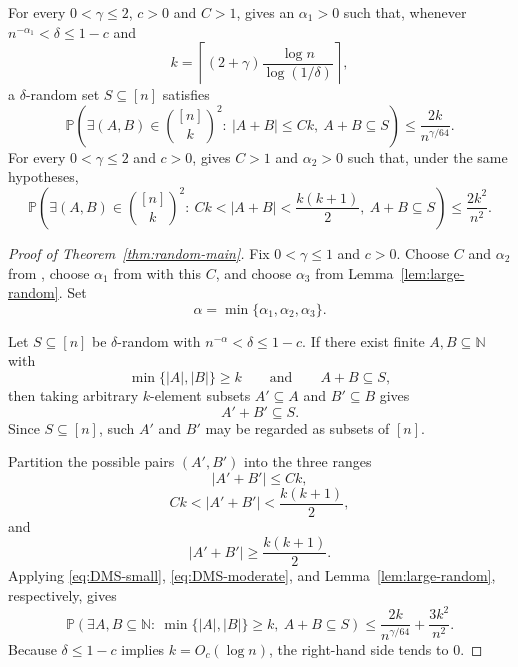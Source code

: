 \documentclass[11pt]{article}
\newcommand{\N}{\mathbb{N}}
\newcommand{\Prob}{\mathbb{P}}
\begin{document}
For every $0<\gamma\le2$, $c>0$ and $C>1$, \cite[Lemma 2.1]{DMS} gives an $\alpha_1>0$ such that, whenever $n^{-\alpha_1}<\delta\le1-c$ and
\[
 k=\left\lceil(2+\gamma)\frac{\log n}{\log(1/\delta)}\right\rceil,
\]
a $\delta$-random set $S\subseteq[n]$ satisfies
\begin{equation}\label{eq:DMS-small}
 \Prob\left(
 \exists(A,B)\in\binom{[n]}{k}^2:\
 |A+B|\le Ck,\ A+B\subseteq S
 \right)
 \le \frac{2k}{n^{\gamma/64}}.
\end{equation}
For every $0<\gamma\le2$ and $c>0$, \cite[Corollary 3.3]{DMS} gives $C>1$ and $\alpha_2>0$ such that, under the same hypotheses,
\begin{equation}\label{eq:DMS-moderate}
 \Prob\left(
 \exists(A,B)\in\binom{[n]}{k}^2:\
 Ck<|A+B|<\frac{k(k+1)}2,\ A+B\subseteq S
 \right)
 \le \frac{2k^2}{n^2}.
\end{equation}

\begin{proof}[Proof of Theorem~\ref{thm:random-main}]
Fix $0<\gamma\le1$ and $c>0$.  Choose $C$ and $\alpha_2$ from \cite[Corollary 3.3]{DMS}, choose $\alpha_1$ from \cite[Lemma 2.1]{DMS} with this $C$, and choose $\alpha_3$ from Lemma~\ref{lem:large-random}.  Set
\[
 \alpha=\min\{\alpha_1,\alpha_2,\alpha_3\}.
\]

Let $S\subseteq[n]$ be $\delta$-random with $n^{-\alpha}<\delta\le1-c$.  If there exist finite $A,B\subseteq\N$ with
\[
 \min\{|A|,|B|\}\ge k
 \qquad\text{and}\qquad
 A+B\subseteq S,
\]
then taking arbitrary $k$-element subsets $A'\subseteq A$ and $B'\subseteq B$ gives
\[
 A'+B'\subseteq S.
\]
Since $S\subseteq[n]$, such $A'$ and $B'$ may be regarded as subsets of $[n]$.

Partition the possible pairs $(A',B')$ into the three ranges
\[
 |A'+B'|\le Ck,
\]
\[
 Ck<|A'+B'|<\frac{k(k+1)}2,
\]
and
\[
 |A'+B'|\ge\frac{k(k+1)}2.
\]
Applying \eqref{eq:DMS-small}, \eqref{eq:DMS-moderate}, and Lemma~\ref{lem:large-random}, respectively, gives
\[
 \Prob\left(\exists A,B\subseteq\N:\ \min\{|A|,|B|\}\ge k,\ A+B\subseteq S\right)
 \le
 \frac{2k}{n^{\gamma/64}}+\frac{3k^2}{n^2}.
\]
Because $\delta\le1-c$ implies $k=O_c(\log n)$, the right-hand side tends to $0$.
\end{proof}
\end{document}
